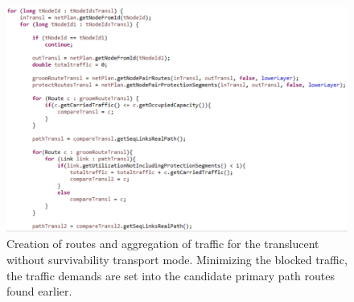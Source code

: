 \begin{figure}[H]
\centering
\includegraphics[width=15cm]{sdf/heuristic/translucent_survivability/figures/grooming_translucent_surv2}
\caption{Creation of routes and aggregation of traffic for the translucent without survivability transport mode. Minimizing the blocked traffic, the traffic demands are set into the candidate primary path routes found earlier.}
\label{grooming_translucent_surv2}
\end{figure}

